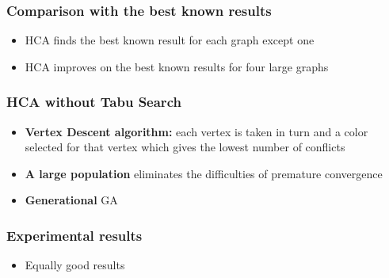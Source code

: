 \documentclass{beamer}
\begin{document}
\begin{frame}
\frametitle{Comparison with the best known results}
\begin{itemize}
\item HCA finds the best known result for each graph except one
\item HCA improves on the best known results for four large graphs
\end{itemize}
\end{frame}


\begin{frame}
\frametitle{HCA without Tabu Search}
\begin{itemize}
\item \textbf{Vertex Descent algorithm:} each vertex is taken in turn and a color selected for that vertex which gives the lowest number of conflicts
\item \textbf{A large population} eliminates the difficulties of premature convergence
\item \textbf{Generational} GA
\end{itemize}
\end{frame}

\begin{frame}
\frametitle{Experimental results}
\begin{itemize}
\item Equally good results
\end{itemize}
\end{frame}
\end{document}
